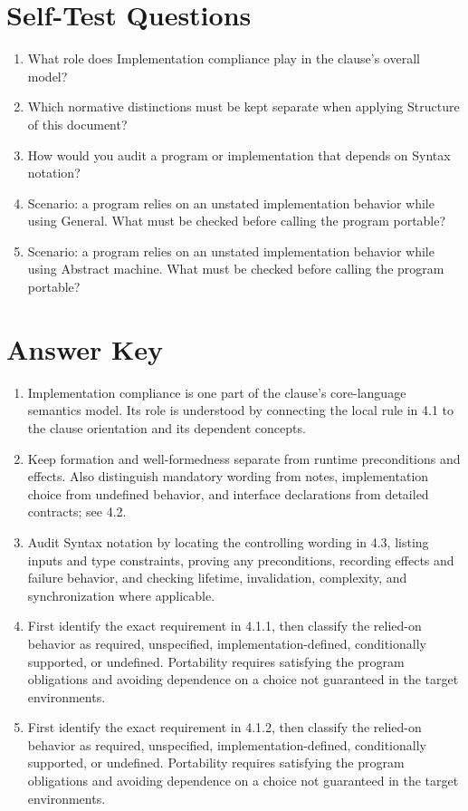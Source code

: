 \documentclass[11pt,letterpaper]{article}
\begin{document}
\section{Self-Test Questions}
\begin{enumerate}
\item What role does Implementation compliance play in the clause's overall model?
\item Which normative distinctions must be kept separate when applying Structure of this document?
\item How would you audit a program or implementation that depends on Syntax notation?
\item Scenario: a program relies on an unstated implementation behavior while using General. What must be checked before calling the program portable?
\item Scenario: a program relies on an unstated implementation behavior while using Abstract machine. What must be checked before calling the program portable?
\end{enumerate}
\clearpage\section{Answer Key}
\begin{enumerate}
\item Implementation compliance is one part of the clause's core-language semantics model. Its role is understood by connecting the local rule in 4.1 to the clause orientation and its dependent concepts.
\item Keep formation and well-formedness separate from runtime preconditions and effects. Also distinguish mandatory wording from notes, implementation choice from undefined behavior, and interface declarations from detailed contracts; see 4.2.
\item Audit Syntax notation by locating the controlling wording in 4.3, listing inputs and type constraints, proving any preconditions, recording effects and failure behavior, and checking lifetime, invalidation, complexity, and synchronization where applicable.
\item First identify the exact requirement in 4.1.1, then classify the relied-on behavior as required, unspecified, implementation-defined, conditionally supported, or undefined. Portability requires satisfying the program obligations and avoiding dependence on a choice not guaranteed in the target environments.
\item First identify the exact requirement in 4.1.2, then classify the relied-on behavior as required, unspecified, implementation-defined, conditionally supported, or undefined. Portability requires satisfying the program obligations and avoiding dependence on a choice not guaranteed in the target environments.
\end{enumerate}
\end{document}
